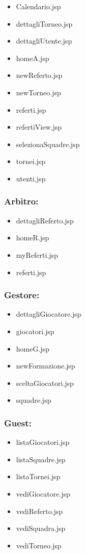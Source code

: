 		\begin{itemize}
			\item Calendario.jsp
			\item dettagliTorneo.jsp
			\item dettagliUtente.jsp
			\item homeA.jsp
			\item newReferto.jsp
			\item newTorneo.jsp
			\item referti.jsp
			\item refertiView.jsp
			\item selezionaSquadre.jsp
			\item tornei.jsp
			\item utenti.jsp	
		\end{itemize}
	
	\subsubsection*{Arbitro:}
	
	\begin{itemize}
		\item dettagliReferto.jsp
		\item homeR.jsp
		\item myReferti.jsp
		\item referti.jsp	
	\end{itemize}
	
	\subsubsection*{Gestore:}
	
	\begin{itemize}
		\item dettagliGiocatore.jsp
		\item giocatori.jsp
		\item homeG.jsp
		\item newFormazione.jsp
		\item sceltaGiocatori.jsp
		\item squadre.jsp	
	\end{itemize}
	
	\subsubsection*{Guest:}
	
	\begin{itemize}
		\item listaGiocatori.jsp
		\item listaSquadre.jsp
		\item listaTornei.jsp
		\item vediGiocatore.jsp
		\item vediReferto.jsp
		\item vediSquadra.jsp
		\item vediTorneo.jsp	
	\end{itemize}

